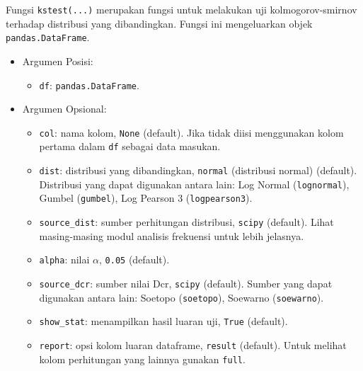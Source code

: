 \documentclass[11pt]{article}
\providecommand{\tightlist}{%
      \setlength{\itemsep}{0pt}\setlength{\parskip}{0pt}}
\begin{document}
Fungsi \texttt{kstest(...)} merupakan fungsi untuk melakukan uji
kolmogorov-smirnov terhadap distribusi yang dibandingkan. Fungsi ini
mengeluarkan objek \texttt{pandas.DataFrame}.

\begin{itemize}
\tightlist
\item
  Argumen Posisi:

  \begin{itemize}
  \tightlist
  \item
    \texttt{df}: \texttt{pandas.DataFrame}.
  \end{itemize}
\item
  Argumen Opsional:

  \begin{itemize}
  \tightlist
  \item
    \texttt{col}: nama kolom, \texttt{None} (default). Jika tidak diisi
    menggunakan kolom pertama dalam \texttt{df} sebagai data masukan.
  \item
    \texttt{dist}: distribusi yang dibandingkan,
    \texttt{\textquotesingle{}normal\textquotesingle{}} (distribusi
    normal) (default). Distribusi yang dapat digunakan antara lain: Log
    Normal (\texttt{\textquotesingle{}lognormal\textquotesingle{}}),
    Gumbel (\texttt{\textquotesingle{}gumbel\textquotesingle{}}), Log
    Pearson 3
    (\texttt{\textquotesingle{}logpearson3\textquotesingle{}}).
  \item
    \texttt{source\_dist}: sumber perhitungan distribusi,
    \texttt{\textquotesingle{}scipy\textquotesingle{}} (default). Lihat
    masing-masing modul analisis frekuensi untuk lebih jelasnya.
  \item
    \texttt{alpha}: nilai \(\alpha\), \texttt{0.05} (default).
  \item
    \texttt{source\_dcr}: sumber nilai Dcr,
    \texttt{\textquotesingle{}scipy\textquotesingle{}} (default). Sumber
    yang dapat digunakan antara lain: Soetopo
    (\texttt{\textquotesingle{}soetopo\textquotesingle{}}), Soewarno
    (\texttt{\textquotesingle{}soewarno\textquotesingle{}}).
  \item
    \texttt{show\_stat}: menampilkan hasil luaran uji, \texttt{True}
    (default).
  \item
    \texttt{report}: opsi kolom luaran dataframe,
    \texttt{\textquotesingle{}result\textquotesingle{}} (default). Untuk
    melihat kolom perhitungan yang lainnya gunakan
    \texttt{\textquotesingle{}full\textquotesingle{}}.
  \end{itemize}
\end{itemize}
\end{document}
